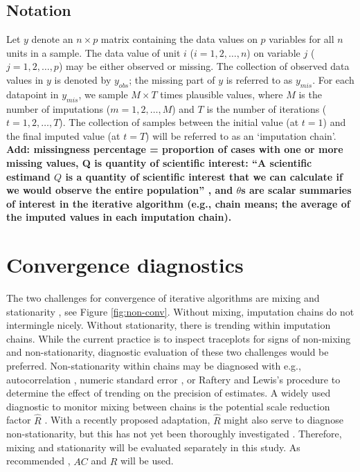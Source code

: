 \documentclass[Royal,times,sageh]{sagej}
\begin{document}
\hypertarget{notation}{%
\subsection{Notation}\label{notation}}

Let \(y\) denote an \(n \times p\) matrix containing the data values on
\(p\) variables for all \(n\) units in a sample. The data value of unit
\(i\) (\(i = 1, 2, \dots, n\)) on variable \(j\)
(\(j = 1, 2, \dots, p\)) may be either observed or missing. The
collection of observed data values in \(y\) is denoted by \(y_{obs}\);
the missing part of \(y\) is referred to as \(y_{mis}\). For each
datapoint in \(y_{mis}\), we sample \(M \times T\) times plausible
values, where \(M\) is the number of imputations
(\(m = 1, 2, \dots, M\)) and \(T\) is the number of iterations
(\(t = 1, 2, \dots, T\)). The collection of samples between the initial
value (at \(t=1\)) and the final imputed value (at \(t=T\)) will be
referred to as an `imputation chain'. \textbf{Add: missingness
percentage = proportion of cases with one or more missing values, Q is
quantity of scientific interest: ``A scientific estimand \(Q\) is a
quantity of scientific interest that we can calculate if we would
observe the entire population'' \citep[par 2.3.1]{buur18}, and
\(\theta\)s are scalar summaries of interest in the iterative algorithm
(e.g., chain means; the average of the imputed values in each imputation
chain). }

\hypertarget{convergence-diagnostics}{%
\section{Convergence diagnostics}\label{convergence-diagnostics}}

The two challenges for convergence of iterative algorithms are mixing
and stationarity \citep{gelm13}, see Figure \ref{fig:non-conv}. Without
mixing, imputation chains do not intermingle nicely. Without
stationarity, there is trending within imputation chains. While the
current practice is to inspect traceplots for signs of non-mixing and
non-stationarity, diagnostic evaluation of these two challenges would be
preferred. Non-stationarity within chains may be diagnosed with e.g.,
autocorrelation \citep[\(AC\);][]{scha97, gelm13}, numeric standard
error \citep[`MC error';][]{gewe92}, or Raftery and Lewis's
\citeyearpar{raft91} procedure to determine the effect of trending on
the precision of estimates. A widely used diagnostic to monitor mixing
between chains is the potential scale reduction factor \(\widehat{R}\)
\citep[`Gelman-Rubin statistic';][]{gelm92}. With a recently proposed
adaptation, \(\widehat{R}\) might also serve to diagnose
non-stationarity, but this has not yet been thoroughly investigated
\citep{veht19}. Therefore, mixing and stationarity will be evaluated
separately in this study. As recommended \citep[e.g.,][p.~898]{cowl96},
\(AC\) and \(\widehat{R}\) will be used.
\end{document}
